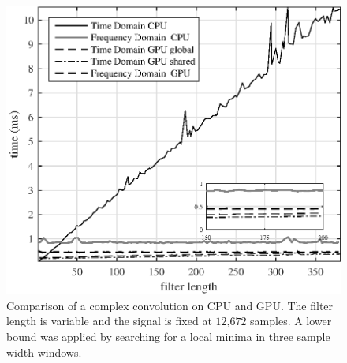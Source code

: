 \begin{figure}
	\centering\includegraphics[width=5in]{figures/gpu_intro/CPUvsGPU_1batch_12672signal_varyFilter.eps}
	\caption{Comparison of a complex convolution on CPU and GPU. The filter length is variable and the signal is fixed at $12$,$672$ samples. A lower bound was applied by searching for a local minima in three sample width windows.}
	\label{fig:CPUvsGPU_1batch_12672signal_varyFilter}
\end{figure}

